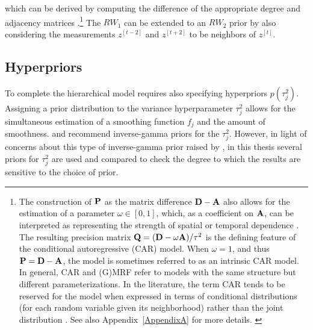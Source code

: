 \noindent which can be derived by computing the difference of the appropriate degree and adjacency matrices .\footnote{The construction of $\mathbf{P}$ as the matrix difference $\mathbf{D} - \mathbf{A}$ also allows for the estimation of a parameter $\omega \in [0,1]$, which, as a coefficient on $\mathbf{A}$, can be interpreted as representing the strength of spatial or temporal dependence . The resulting precision matrix $\mathbf{Q}= (\mathbf{D} - \omega \mathbf{A})/\tau^2$ is the defining feature of the conditional autoregressive (CAR) model.  When $\omega = 1$, and thus $\mathbf{P}= \mathbf{D} - \mathbf{A}$, the model is sometimes referred to as an intrinsic CAR model. In general, CAR and (G)MRF refer to models with the same structure but different parameterizations. In the literature, the term CAR tends to be reserved for the model when expressed in terms of conditional distributions (for each random variable given its neighborhood) rather than the joint distribution . See also Appendix~\ref{AppendixA} for more details. \label{footnote_car}} The $RW_1$ can be extended to an $RW_2$ prior by also considering the measurements $z^{[t-2]}$  and $z^{[t+2]}$ to be neighbors of $z^{[t]}$. 


\subsection{Hyperpriors}
\label{hyperpriors}

To complete the hierarchical model requires also specifying hyperpriors $p(\tau_j^2)$.  Assigning a prior distribution to the variance hyperparameter $\tau_j^2$ allows for the simultaneous estimation of a smoothing function $f_j$ and the amount of smoothness.  and  recommend  inverse-gamma priors for the $\tau_j^2$. However, in light of concerns about this type of inverse-gamma prior raised by , in this thesis several priors for $\tau^2_j$ are used and compared to check the degree to which the results are sensitive to the choice of prior.

